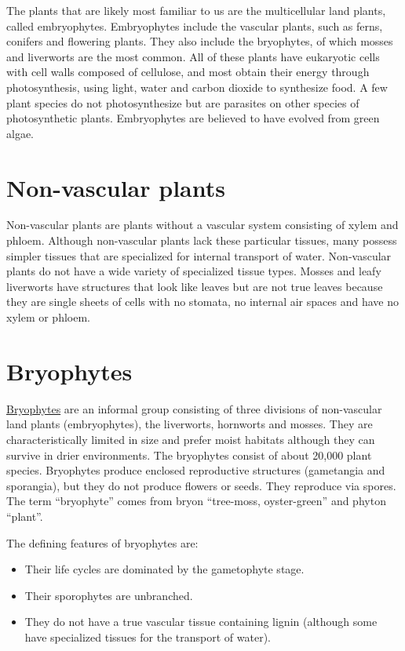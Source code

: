 The plants that are likely most familiar to us are the multicellular
land plants, called embryophytes. Embryophytes include the vascular
plants, such as ferns, conifers and flowering plants. They also include
the bryophytes, of which mosses and liverworts are the most common. All
of these plants have eukaryotic cells with cell walls composed of
cellulose, and most obtain their energy through photosynthesis, using
light, water and carbon dioxide to synthesize food. A few plant species
do not photosynthesize but are parasites on other species of
photosynthetic plants. Embryophytes are believed to have evolved from
green algae.

\section{Non-vascular plants}\label{non-vascular-plants}

Non-vascular plants are plants without a vascular system consisting of
xylem and phloem. Although non-vascular plants lack these particular
tissues, many possess simpler tissues that are specialized for internal
transport of water. Non-vascular plants do not have a wide variety of
specialized tissue types. Mosses and leafy liverworts have structures
that look like leaves but are not true leaves because they are single
sheets of cells with no stomata, no internal air spaces and have no
xylem or phloem.

\section{Bryophytes}\label{bryophytes}

\href{https://en.wikipedia.org/wiki/Bryophyte}{Bryophytes} are an
informal group consisting of three divisions of non-vascular land plants
(embryophytes), the liverworts, hornworts and mosses. They are
characteristically limited in size and prefer moist habitats although
they can survive in drier environments. The bryophytes consist of about
20,000 plant species. Bryophytes produce enclosed reproductive
structures (gametangia and sporangia), but they do not produce flowers
or seeds. They reproduce via spores. The term ``bryophyte'' comes from
bryon ``tree-moss, oyster-green'' and phyton ``plant''.

The defining features of bryophytes are:

\begin{itemize}
\tightlist
\item
  Their life cycles are dominated by the gametophyte stage.
\item
  Their sporophytes are unbranched.
\item
  They do not have a true vascular tissue containing lignin (although
  some have specialized tissues for the transport of water).
\end{itemize}

